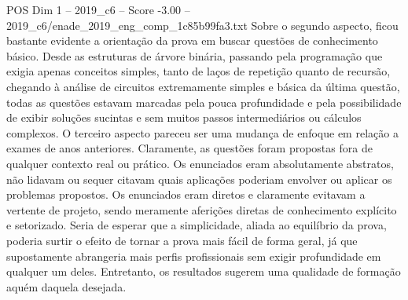 \begin{textsample}{POS Dim 1 – 2019\_c6 – Score -3.00 – 2019\_c6/enade\_2019\_eng\_comp\_1c85b99fa3.txt}
Sobre o segundo aspecto, ficou bastante evidente a orientação da prova em buscar questões de conhecimento básico.
Desde as estruturas de árvore binária, passando pela programação que exigia apenas conceitos simples, tanto de laços de repetição quanto de recursão, chegando à análise de circuitos extremamente simples e básica da última questão, todas as questões estavam marcadas pela pouca profundidade e pela possibilidade de exibir soluções sucintas e sem muitos passos intermediários ou cálculos complexos.
O terceiro aspecto pareceu ser uma mudança de enfoque em relação a exames de anos anteriores.
Claramente, as questões foram propostas fora de qualquer contexto real ou prático.
Os enunciados eram absolutamente abstratos, não lidavam ou sequer citavam quais aplicações poderiam envolver ou aplicar os problemas propostos.
Os enunciados eram diretos e claramente evitavam a vertente de projeto, sendo meramente aferições diretas de conhecimento explícito e setorizado.
Seria de esperar que a simplicidade, aliada ao equilíbrio da prova, poderia surtir o efeito de tornar a prova mais fácil de forma geral, já que supostamente abrangeria mais perfis profissionais sem exigir profundidade em qualquer um deles.
Entretanto, os resultados sugerem uma qualidade de formação aquém daquela desejada.

\end{textsample}
